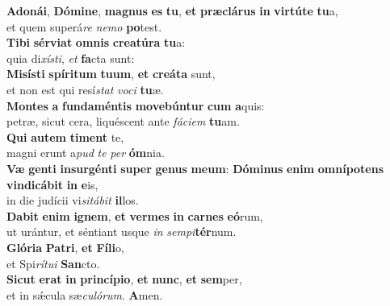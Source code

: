 \evenverse \textbf{A}\textbf{do}\textbf{ná}\textbf{i}, \textbf{Dó}\textbf{mi}\textbf{ne}, \textbf{ma}\textbf{gnus} \textbf{es} \textbf{tu}, \textbf{et} \textbf{præ}\textbf{clá}\textbf{rus} \textbf{in} \textbf{vir}\textbf{tú}\textbf{te} \textbf{tu}a,~\*\\
\evenverse et quem superá\textit{re} \textit{ne}\textit{mo} \textbf{po}test.\\
\oddverse \textbf{Ti}\textbf{bi} \textbf{sér}\textbf{vi}\textbf{at} \textbf{om}\textbf{nis} \textbf{cre}\textbf{a}\textbf{tú}\textbf{ra} \textbf{tu}a:~\*\\
\oddverse quia di\textit{xí}\textit{sti}, \textit{et} \textbf{fa}cta sunt:\\
\evenverse \textbf{Mi}\textbf{sí}\textbf{sti} \textbf{spí}\textbf{ri}\textbf{tum} \textbf{tu}\textbf{um}, \textbf{et} \textbf{cre}\textbf{á}\textbf{ta} sunt,~\*\\
\evenverse et non est qui resí\textit{stat} \textit{vo}\textit{ci} \textbf{tu}æ.\\
\oddverse \textbf{Mon}\textbf{tes} \textbf{a} \textbf{fun}\textbf{da}\textbf{mén}\textbf{tis} \textbf{mo}\textbf{ve}\textbf{bún}\textbf{tur} \textbf{cum} \textbf{a}quis:~\*\\
\oddverse petræ, sicut cera, liquéscent ante \textit{fá}\textit{ci}\textit{em} \textbf{tu}am.\\
\evenverse \textbf{Qui} \textbf{au}\textbf{tem} \textbf{ti}\textbf{ment} te,~\*\\
\evenverse magni erunt a\textit{pud} \textit{te} \textit{per} \textbf{óm}nia.\\
\oddverse \textbf{Væ} \textbf{gen}\textbf{ti} \textbf{in}\textbf{sur}\textbf{gén}\textbf{ti} \textbf{su}\textbf{per} \textbf{ge}\textbf{nus} \textbf{me}\textbf{um}: \textbf{Dó}\textbf{mi}\textbf{nus} \textbf{e}\textbf{nim} \textbf{om}\textbf{ní}\textbf{po}\textbf{tens} \textbf{vin}\textbf{di}\textbf{cá}\textbf{bit} \textbf{in} \textbf{e}is,~\*\\
\oddverse in die judícii vi\textit{si}\textit{tá}\textit{bit} \textbf{il}los.\\
\evenverse \textbf{Da}\textbf{bit} \textbf{e}\textbf{nim} \textbf{i}\textbf{gnem}, \textbf{et} \textbf{ver}\textbf{mes} \textbf{in} \textbf{car}\textbf{nes} \textbf{e}\textbf{ó}rum,~\*\\
\evenverse ut urántur, et séntiant usque \textit{in} \textit{sem}\textit{pi}\textbf{tér}num.\\
\oddverse \textbf{Gló}\textbf{ri}\textbf{a} \textbf{Pa}\textbf{tri}, \textbf{et} \textbf{Fí}\textbf{li}o,~\*\\
\oddverse et Spi\textit{rí}\textit{tu}\textit{i} \textbf{San}cto.\\
\evenverse \textbf{Si}\textbf{cut} \textbf{e}\textbf{rat} \textbf{in} \textbf{prin}\textbf{cí}\textbf{pi}\textbf{o}, \textbf{et} \textbf{nunc}, \textbf{et} \textbf{sem}per,~\*\\
\evenverse et in sǽcula sæ\textit{cu}\textit{ló}\textit{rum}. \textbf{A}men.\\
